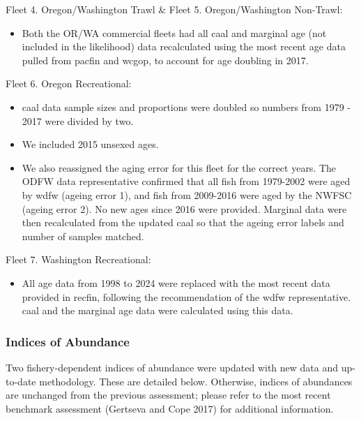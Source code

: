 \documentclass[
]{scrartcl}
\providecommand{\tightlist}{%
  \setlength{\itemsep}{0pt}\setlength{\parskip}{0pt}}\usepackage{longtable,booktabs,array}
\begin{document}
Fleet 4. Oregon/Washington Trawl \& Fleet 5. Oregon/Washington
Non-Trawl:

\begin{itemize}
\tightlist
\item
  Both the OR/WA commercial fleets had all \gls{caal} and marginal age
  (not included in the likelihood) data recalculated using the most
  recent age data pulled from \gls{pacfin} and \gls{wcgop}, to account
  for age doubling in 2017.
\end{itemize}

Fleet 6. Oregon Recreational:

\begin{itemize}
\tightlist
\item
  \gls{caal} data sample sizes and proportions were doubled so numbers
  from 1979 - 2017 were divided by two.
\item
  We included 2015 unsexed ages.
\item
  We also reassigned the aging error for this fleet for the correct
  years. The ODFW data representative confirmed that all fish from
  1979-2002 were aged by \gls{wdfw} (ageing error 1), and fish from
  2009-2016 were aged by the NWFSC (ageing error 2). No new ages since
  2016 were provided. Marginal data were then recalculated from the
  updated \gls{caal} so that the ageing error labels and number of
  samples matched.
\end{itemize}

Fleet 7. Washington Recreational:

\begin{itemize}
\tightlist
\item
  All age data from 1998 to 2024 were replaced with the most recent data
  provided in \gls{recfin}, following the recommendation of the
  \gls{wdfw} representative. \gls{caal} and the marginal age data were
  calculated using this data.
\end{itemize}

\subsubsection{Indices of Abundance}\label{indices-of-abundance}

Two fishery-dependent indices of abundance were updated with new data
and up-to-date methodology. These are detailed below. Otherwise, indices
of abundances are unchanged from the previous assessment; please refer
to the most recent benchmark assessment (Gertseva and Cope 2017) for
additional information.
\end{document}
